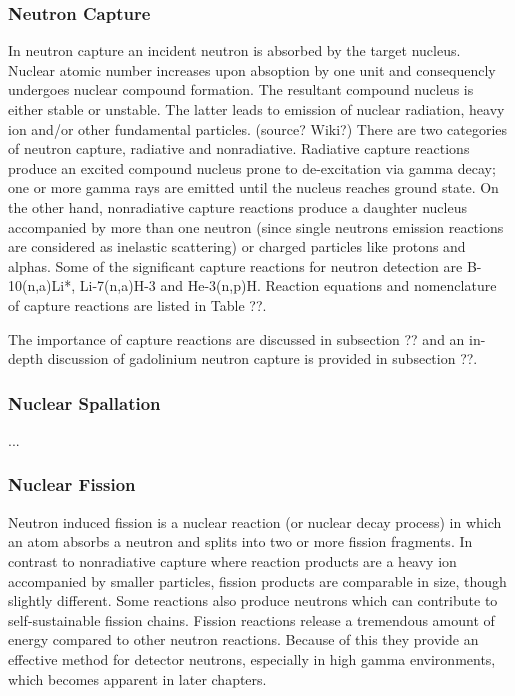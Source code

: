 \subsubsection{Neutron Capture}
In neutron capture an incident neutron is absorbed by the target nucleus. Nuclear atomic number increases upon absoption by one unit and consequencly undergoes nuclear compound formation. The resultant compound nucleus is either stable or unstable. The latter leads to emission of nuclear radiation, heavy ion and/or other fundamental particles. (source? Wiki?)
There are two categories of neutron capture, radiative and nonradiative. Radiative capture reactions produce an excited compound nucleus prone to de-excitation via gamma decay; one or more gamma rays are emitted until the nucleus reaches ground state.
On the other hand, nonradiative capture reactions produce a daughter nucleus accompanied by more than one neutron (since single neutrons emission reactions are considered as inelastic scattering) or charged particles like protons and alphas.
Some of the significant capture reactions for neutron detection are B-10(n,a)Li*, Li-7(n,a)H-3 and He-3(n,p)H.
Reaction equations and nomenclature of capture reactions are listed in Table ??.

The importance of capture reactions are discussed in subsection ?? and an in-depth discussion of gadolinium neutron capture is provided in subsection ??.

\subsubsection{Nuclear Spallation}
...
\subsubsection{Nuclear Fission}
Neutron induced fission is a nuclear reaction (or nuclear decay process) in which an atom absorbs a neutron and splits into two or more fission fragments. In contrast to nonradiative capture where reaction products are a heavy ion accompanied by smaller particles, fission products are comparable in size, though slightly different. Some reactions also produce neutrons which can contribute to self-sustainable fission chains.
Fission reactions release a tremendous amount of energy compared to other neutron reactions. Because of this they provide an effective method for detector neutrons, especially in high gamma environments, which becomes apparent in later chapters.
